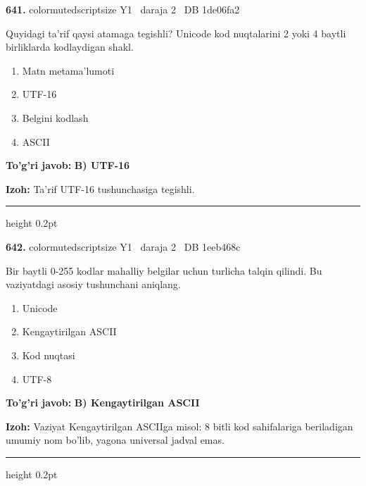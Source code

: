 \documentclass[10pt,a4paper,oneside]{article}
\begin{document}
\noindent\textbf{\color{ink}641.}  {color{muted}scriptsize Y1 \textbullet\ daraja 2 \textbullet\ DB 1de06fa2}
\par
Quyidagi ta'rif qaysi atamaga tegishli? Unicode kod nuqtalarini 2 yoki 4 baytli birliklarda kodlaydigan shakl.
\begin{enumerate}[label=\Alph*),leftmargin=9mm]
\item Matn metama'lumoti
\item UTF-16
\item Belgini kodlash
\item ASCII
\end{enumerate}
\begin{tcolorbox}[enhanced,breakable,colback=teal!4,colframe=teal!50!black,boxrule=0.5pt,arc=1.1mm,left=3mm,right=3mm,top=1.7mm,bottom=1.7mm,before skip=2mm,after skip=2mm]
\textbf{\color{teal}To'g'ri javob:} \textbf{B) UTF-16}
\par\smallskip
\textbf{Izoh:} Ta'rif UTF-16 tushunchasiga tegishli.
\end{tcolorbox}
\vspace{2mm}\hrule height 0.2pt \vspace{3mm}

\noindent\textbf{\color{ink}642.}  {color{muted}scriptsize Y1 \textbullet\ daraja 2 \textbullet\ DB 1eeb468c}
\par
Bir baytli 0-255 kodlar mahalliy belgilar uchun turlicha talqin qilindi. Bu vaziyatdagi asosiy tushunchani aniqlang.
\begin{enumerate}[label=\Alph*),leftmargin=9mm]
\item Unicode
\item Kengaytirilgan ASCII
\item Kod nuqtasi
\item UTF-8
\end{enumerate}
\begin{tcolorbox}[enhanced,breakable,colback=teal!4,colframe=teal!50!black,boxrule=0.5pt,arc=1.1mm,left=3mm,right=3mm,top=1.7mm,bottom=1.7mm,before skip=2mm,after skip=2mm]
\textbf{\color{teal}To'g'ri javob:} \textbf{B) Kengaytirilgan ASCII}
\par\smallskip
\textbf{Izoh:} Vaziyat Kengaytirilgan ASCIIga misol: 8 bitli kod sahifalariga beriladigan umumiy nom bo'lib, yagona universal jadval emas.
\end{tcolorbox}
\vspace{2mm}\hrule height 0.2pt \vspace{3mm}
\end{document}
